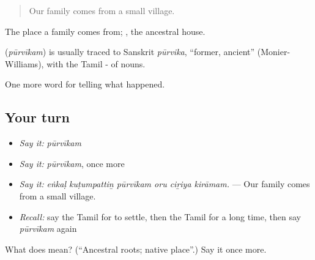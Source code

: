 \begin{quote}
Our family comes from a small village.
\end{quote}

The place a family comes from;  , the ancestral house.

\begin{cousinweb}
\textbf{} (\emph{pūrvīkam}) is usually traced to Sanskrit \emph{pūrvika}, \textquotedblleft{}former, ancient\textquotedblright{} (Monier-Williams), with the Tamil - of nouns.
\end{cousinweb}

\begin{grammarlens}[title={What you've built}]
One more word for telling what happened.
\end{grammarlens}

\subsection*{Your turn}
\begin{itemize}
\raggedright
  \item \emph{Say it:} \emph{pūrvīkam}
  \item \emph{Say it:} \emph{pūrvīkam}, once more
  \item \emph{Say it:} \emph{eṅkaḷ kuṭumpattiṉ pūrvīkam oru ciṟiya kirāmam.} — Our family comes from a small village.
  \item \emph{Recall:} say the Tamil for to settle, then the Tamil for a long time, then say \emph{pūrvīkam} again
\end{itemize}

\begin{tcolorbox}[breakable,colback=teal!4,colframe=teal!35!black,title={Before you move on}]
What does  mean? (\textquotedblleft{}Ancestral roots; native place\textquotedblright{}.) Say it once more.
\end{tcolorbox}
